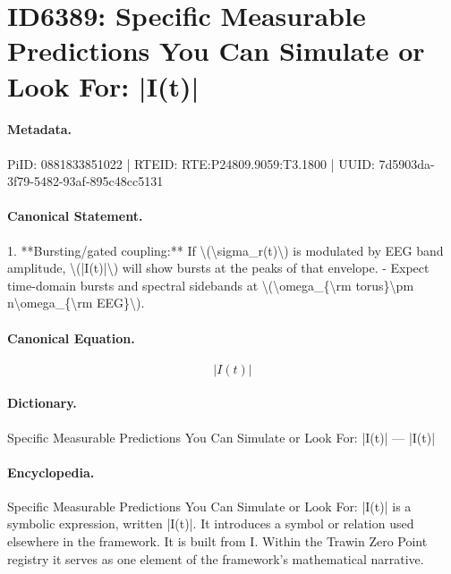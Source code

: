 \section*{ID6389: Specific Measurable Predictions You Can Simulate or Look For: |I(t)|}
\paragraph{Metadata.}
PiID: 0881833851022 | RTEID: RTE:P24809.9059:T3.1800 | UUID: 7d5903da-3f79-5482-93af-895c48cc5131

\paragraph{Canonical Statement.}
1. **Bursting/gated coupling:** If \textbackslash{}(\textbackslash{}sigma\_r(t)\textbackslash{}) is modulated by EEG band amplitude, \textbackslash{}(|I(t)|\textbackslash{}) will show bursts at the peaks of that envelope. - Expect time-domain bursts and spectral sidebands at \textbackslash{}(\textbackslash{}omega\_\{\textbackslash{}rm torus\}\textbackslash{}pm n\textbackslash{}omega\_\{\textbackslash{}rm EEG\}\textbackslash{}).

\paragraph{Canonical Equation.}
\[
|I(t)|
\]

\paragraph{Dictionary.}
Specific Measurable Predictions You Can Simulate or Look For: |I(t)| — |I(t)|

\paragraph{Encyclopedia.}
Specific Measurable Predictions You Can Simulate or Look For: |I(t)| is a symbolic expression, written |I(t)|. It introduces a symbol or relation used elsewhere in the framework. It is built from I. Within the Trawin Zero Point registry it serves as one element of the framework's mathematical narrative.
